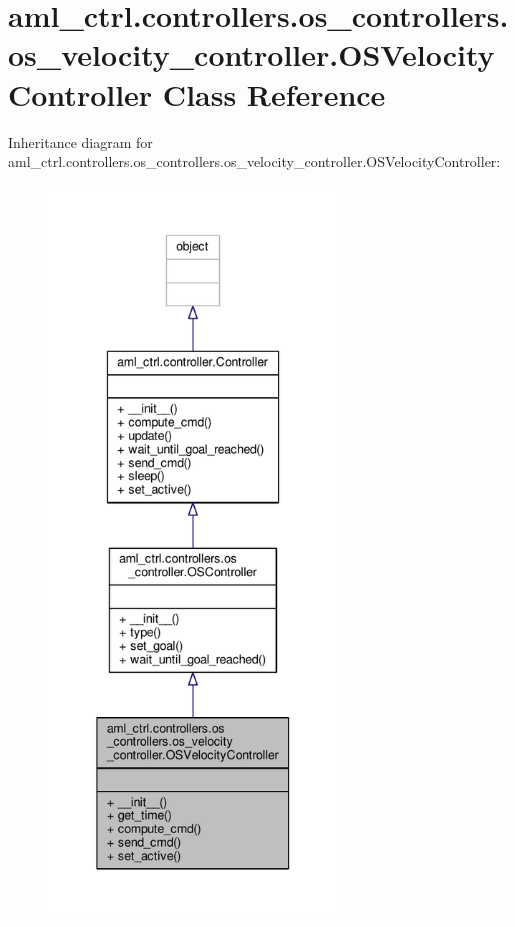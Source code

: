 \hypertarget{classaml__ctrl_1_1controllers_1_1os__controllers_1_1os__velocity__controller_1_1_o_s_velocity_controller}{\section{aml\-\_\-ctrl.\-controllers.\-os\-\_\-controllers.\-os\-\_\-velocity\-\_\-controller.\-O\-S\-Velocity\-Controller Class Reference}
\label{classaml__ctrl_1_1controllers_1_1os__controllers_1_1os__velocity__controller_1_1_o_s_velocity_controller}
}


Inheritance diagram for aml\-\_\-ctrl.\-controllers.\-os\-\_\-controllers.\-os\-\_\-velocity\-\_\-controller.\-O\-S\-Velocity\-Controller\-:\nopagebreak
\begin{figure}[H]
\begin{center}
\leavevmode
\includegraphics[height=550pt]{classaml__ctrl_1_1controllers_1_1os__controllers_1_1os__velocity__controller_1_1_o_s_velocity_controller__inherit__graph}
\end{center}
\end{figure}


